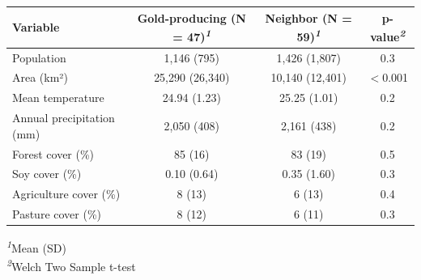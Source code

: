 {\small
\begin{tabular}{lccc}
\toprule
\textbf{Variable} & \textbf{Gold-producing} (N = 47)\textsuperscript{\textit{1}} & \textbf{Neighbor} (N = 59)\textsuperscript{\textit{1}} & \textbf{p-value}\textsuperscript{\textit{2}} \\ 
\midrule\addlinespace[2.5pt]
Population & 1,146 (795) & 1,426 (1,807) & 0.3 \\ 
Area (km²) & 25,290 (26,340) & 10,140 (12,401) & $<$0.001 \\ 
Mean temperature & 24.94 (1.23) & 25.25 (1.01) & 0.2 \\ 
Annual precipitation (mm) & 2,050 (408) & 2,161 (438) & 0.2 \\ 
Forest cover (\%) & 85 (16) & 83 (19) & 0.5 \\ 
Soy cover (\%) & 0.10 (0.64) & 0.35 (1.60) & 0.3 \\ 
Agriculture cover (\%) & 8 (13) & 6 (13) & 0.4 \\ 
Pasture cover (\%) & 8 (12) & 6 (11) & 0.3 \\ 
\bottomrule
\end{tabular}
\begin{center}
\vspace{.05em}
\textsuperscript{\textit{1}}Mean (SD)\\
\textsuperscript{\textit{2}}Welch Two Sample t-test\\
\end{center}

}
